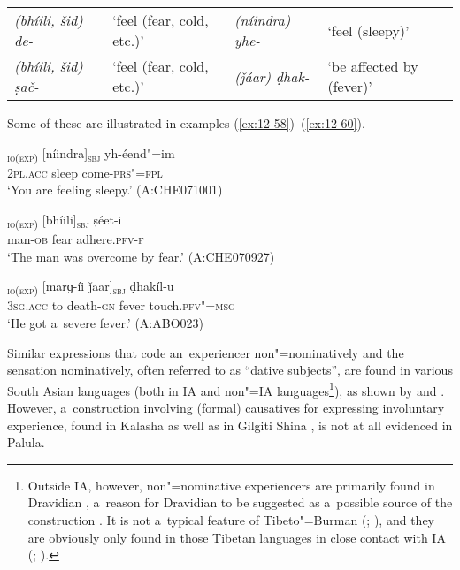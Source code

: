 \begin{table}[H]
  \begin{tabularx}{\textwidth}{ Q Q Q Q }
\textit{(bhíili, šid) de-} &
`feel (fear, cold, etc.)' &
\textit{(níindra) yhe-} &
`feel (sleepy)'\\
\textit{(bhíili, šid) ṣač-} &
`feel (fear, cold, etc.)' &
\textit{(ǰáar) ḍhak-} &
`be affected by (fever)'\\
\end{tabularx}
\end{table}


Some of these are illustrated in examples (\ref{ex:12-58})--(\ref{ex:12-60}).

\begin{exe}
\ex
\label{ex:12-58}
\gll [tusaám]\textsubscript{\textsc{io(exp)}} [níindra]\textsubscript{\textsc{sbj}} yh-éend"=im \\
\textsc{2pl.acc} sleep come-\textsc{prs"=fpl} \\
\glt `You are feeling sleepy.' (A:CHE071001)

\ex
\label{ex:12-59}
\gll [míiš-a]\textsubscript{\textsc{io(exp)}} [bhíili]\textsubscript{\textsc{sbj}}
ṣéet-i \\
man-\textsc{ob} fear adhere.\textsc{pfv-f} \\
\glt `The man was overcome by fear.' (A:CHE070927)

\ex
\label{ex:12-60}
\textsubscript{\textsc{ io(exp)}} [marɡ-íi ǰaar]\textsubscript{\textsc{sbj}} ḍhakíl-u \\
3\textsc{sg.acc} to death-\textsc{gn} fever touch.\textsc{pfv"=msg} \\
\glt `He got a~severe fever.' (A:ABO023)
\end{exe}

Similar expressions that code an~experiencer non"=nominatively and the sensation nominatively, often referred to as ``dative subjects'', are found in various South Asian languages (both in IA and non"=IA languages\footnote{Outside IA, however, non"=nominative experiencers are primarily found in Dravidian \citep[260--263]{abbi1990}, a~reason for Dravidian to be suggested as a~possible source of the construction \citep[136]{hock1990}. It is not a~typical feature of Tibeto"=Burman (\citealt[260]{abbi1990}; \citealt[82]{bickel2004}), and they are obviously only found in those Tibetan languages in close contact with IA (\citealt[83, 88]{bickel2004}; \citealt[8--9]{noonan2003}).}), as shown by \citet[326--330]{hook1990b} and \citet[256--263]{abbi1990}. However, a~construction involving (formal) causatives for expressing involuntary experience, found in Kalasha \citep[310]{bashir1990} as well as in Gilgiti Shina \citep{hookzia1987}, is not at all evidenced in Palula. 



